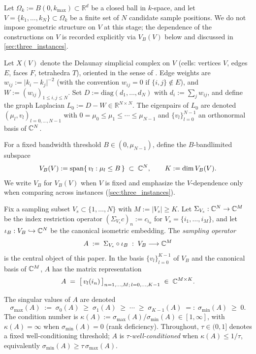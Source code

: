 Let $\Omega_k := B(0, k_{\max}) \subset \mathbb{R}^d$ be a closed ball
in $k$-space, and let $V = \{k_1, \ldots, k_N\} \subset \Omega_k$ be a
finite set of $N$ candidate sample positions. We do not impose
geometric structure on $V$ at this stage; the dependence of the
constructions on $V$ is recorded explicitly via $V_B(V)$ below and
discussed in \cref{sec:three_instances}.

Let $X(V)$ denote the Delaunay simplicial complex on $V$ (cells:
vertices $V$, edges $E$, faces $F$, tetrahedra $T$), oriented in the
sense of \cite[\S 2.1]{Hatcher2002}. Edge weights are
$w_{ij} := \lvert k_i - k_j \rvert^{-2}$ (with the convention
$w_{ij} = 0$ if $\{i,j\} \notin E$), and
$W := (w_{ij})_{1 \le i, j \le N}$. Set
$D := \mathrm{diag}(d_1, \ldots, d_N)$ with $d_i := \sum_j w_{ij}$,
and define the graph Laplacian
$L_0 := D - W \in \mathbb{R}^{N \times N}$. The eigenpairs of $L_0$
are denoted $(\mu_l, v_l)_{l = 0, \ldots, N-1}$ with
$0 = \mu_0 \le \mu_1 \le \cdots \le \mu_{N-1}$ and
$\{v_l\}_{l=0}^{N-1}$ an orthonormal basis of $\mathbb{C}^N$.

For a fixed bandwidth threshold $B \in (0, \mu_{N-1})$, define the
$B$-bandlimited subspace
\begin{equation}\label{eq:VB-def}
  V_B(V) := \mathrm{span}\{\, v_l : \mu_l \le B \,\} \;\subset\; \mathbb{C}^N,
  \qquad K := \dim V_B(V).
\end{equation}
We write $V_B$ for $V_B(V)$ when $V$ is fixed and emphasize the
$V$-dependence only when comparing across instances
(\cref{sec:three_instances}).

Fix a sampling subset $V_s \subset \{1, \ldots, N\}$ with
$M := \lvert V_s \rvert \ge K$. Let
$\Sigma_{V_s} : \mathbb{C}^N \to \mathbb{C}^M$ be the index restriction operator
$(\Sigma_{V_s} c)_n := c_{i_n}$ for $V_s = \{i_1, \ldots, i_M\}$, and
let $\iota_B : V_B \hookrightarrow \mathbb{C}^N$ be the canonical isometric
embedding. The \emph{sampling operator}
\begin{equation}\label{eq:A-def}
  A \;:=\; \Sigma_{V_s} \circ \iota_B \;:\; V_B \longrightarrow \mathbb{C}^M
\end{equation}
is the central object of this paper. In the basis
$\{v_l\}_{l=0}^{K-1}$ of $V_B$ and the canonical basis of $\mathbb{C}^M$, $A$
has the matrix representation
\[
  A \;=\; \bigl[\, v_l(i_n) \,\bigr]_{n = 1, \ldots, M;\, l = 0, \ldots, K-1}
  \;\in\; \mathbb{C}^{M \times K}.
\]

The singular values of $A$ are denoted
\[
  \sigma_{\max}(A) \;:=\; \sigma_0(A)
  \;\ge\; \sigma_1(A) \;\ge\; \cdots \;\ge\; \sigma_{K-1}(A)
  \;=:\; \sigma_{\min}(A) \;\ge\; 0.
\]
The condition number is
$\kappa(A) := \sigma_{\max}(A) / \sigma_{\min}(A) \in [1, \infty]$,
with $\kappa(A) = \infty$ when $\sigma_{\min}(A) = 0$ (rank
deficiency). Throughout, $\tau \in (0, 1]$ denotes a fixed
well-conditioning threshold; $A$ is \emph{$\tau$-well-conditioned}
when $\kappa(A) \le 1/\tau$, equivalently
$\sigma_{\min}(A) \ge \tau \, \sigma_{\max}(A)$.

